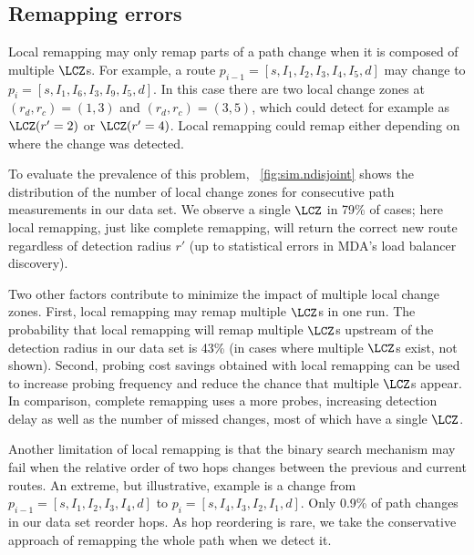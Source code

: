 \subsection{Remapping errors}
\label{sec:remap.errors}

Local remapping may only remap parts of a path change when it is
composed of multiple $\LCZ$s.  For example, a route
$p_{i-1} = [s, I_1, I_2, I_3, I_4, I_5, d]$ may change to $p_i =[s, I_1, I_6, I_3, I_9, I_5, d]$.  
In this case there are two local change zones at $(r_d,r_c)=(1,3)$ and $(r_d,r_c)=(3,5)$,
which  \dtrack{} could detect for example as $\LCZ(r'=2)$ or $\LCZ(r'=4)$. 
Local remapping could remap either depending on where the change was detected.



To evaluate the prevalence of this problem,
\figstr~\ref{fig:sim.ndisjoint} shows the distribution of the number of
local change zones for consecutive path measurements in our data
set.\footnotemark{}  We observe a single $\LCZ$ in 79\% of cases; here
local remapping, just like complete remapping, will return the correct
new route regardless of detection radius $r'$ (up to statistical errors
in MDA's load balancer discovery).



Two other factors contribute to minimize the impact of multiple local
change zones.  First, local remapping may remap multiple $\LCZ$s in one
run.  The probability that local remapping will remap multiple $\LCZ$s
upstream of the detection radius in our data set is 43\% (in cases where
multiple $\LCZ$s exist, not shown).  Second, probing cost savings
obtained with local remapping can be used to increase probing frequency
and reduce the chance that multiple $\LCZ$s appear.  In
comparison, complete remapping uses a more probes, increasing detection
delay as well as the number of missed changes, most of which have a
single $\LCZ$.

Another limitation of local remapping is that the binary search
mechanism may fail when the relative order of two hops changes between
the previous and current routes.  An extreme, but illustrative, example
is a change from $p_{i-1} = [s, I_1, I_2, I_3, I_4, d]$ to $p_i =
[s, I_4, I_3, I_2, I_1, d]$.  Only 0.9\% of path changes in our data set
reorder hops.  As hop reordering is rare, we take the conservative
approach of remapping the whole path when we detect it. 


